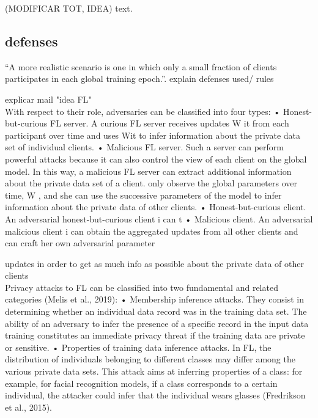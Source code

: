 (MODIFICAR TOT, IDEA) text.\\

\subsection{defenses}
“A more realistic scenario is one in which only a small fraction of clients participates in each global training epoch.”.
explain defenses used/ rules

explicar mail "idea FL"\\

With respect to their role, adversaries can be classified into four types:
• Honest-but-curious FL server. A curious FL server receives updates W
it from each participant over time and uses Wit to infer information about the
private data set of individual clients.
• Malicious FL server. Such a server can perform powerful attacks because
it can also control the view of each client on the global model. In this way, a malicious FL server can extract additional information about the private data set of a client.
only observe the global parameters over time, W , and she can use the successive parameters of the model to infer information about the private data of other clients.
• Honest-but-curious client. An adversarial honest-but-curious client i can t
• Malicious client. An adversarial malicious client i can obtain the aggregated updates from all other clients and can craft her own adversarial parameter

updates in order to get as much info as possible about the private data of other clients
\\

Privacy attacks to FL can be classified into two fundamental and related categories (Melis et al., 2019):
• Membership inference attacks. They consist in determining whether an individual data record was in the training data set. The ability of an adversary to infer the presence of a specific record in the input data training constitutes an immediate privacy threat if the training data are private or sensitive.
• Properties of training data inference attacks. In FL, the distribution of individuals belonging to different classes may differ among the various private data sets. This attack aims at inferring properties of a class: for example, for facial recognition models, if a class corresponds to a certain individual, the attacker could infer that the individual wears glasses (Fredrikson et al., 2015).\\


